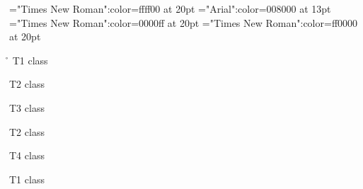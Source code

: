 \font\tdta="Times New Roman":color=ffff00 at 20pt
\font\tctbta="Arial":color=008000 at 13pt
\font\tbta="Times New Roman":color=0000ff at 20pt
\font\ta="Times New Roman":color=ff0000 at 20pt
 \r\n
\ta T1 class 

\tbta T2 class 

\tctbta T3 class 

\tbta T2 class 

\tdta T4 class 

\ta T1 class 


\bye
